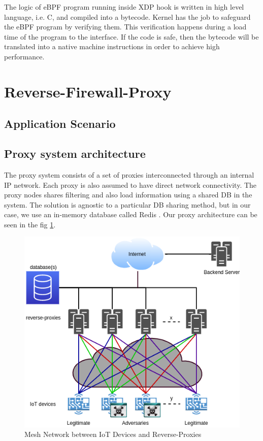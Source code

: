 \documentclass[sigplan,screen]{acmart}
\begin{document}
The logic of eBPF program running inside XDP hook is written in high level language, i.e. C, and compiled into a bytecode. Kernel has the job to safeguard the eBPF program by verifying them. This verification happens during a load time of the program to the interface. If the code is safe, then the bytecode will be translated into a native machine instructions in order to achieve high performance.

\section{Reverse-Firewall-Proxy}
\subsection{Application Scenario}

\subsection{Proxy system architecture}
The proxy system consists of a set of proxies interconnected through an internal IP network. Each proxy is also assumed to have direct network connectivity. The proxy nodes shares filtering and also load information using a shared DB in the system. The solution is agnostic to a particular DB sharing method, but in our case, we use an in-memory database called Redis \cite{redis}. Our proxy architecture can be seen in the fig \ref{proxies}.

\begin{figure}[htbp]
\centerline{\includegraphics[scale=0.35]{pic/proxies.png}}
\caption{Mesh Network between IoT Devices and Reverse-Proxies}
\label{proxies}
\end{figure}
\end{document}
